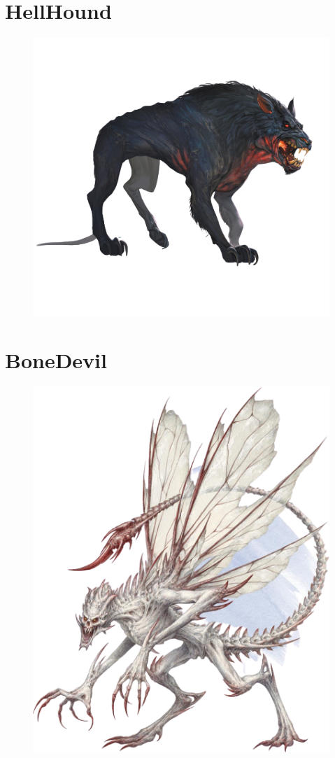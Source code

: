 \documentclass[oneside]{clgrammar}
\begin{document}
\section{HellHound}
\begin{figure}[h!]
\centering
\includegraphics[width=450pt]{images/monstros/hellhound-removebg-preview.png}
\end{figure}

\newpage
\section{BoneDevil}
\begin{figure}[h!]
\centering
\includegraphics[width=350pt]{images/monstros/bonedevil-removebg-preview.png}
\end{figure}

\newpage
\end{document}

